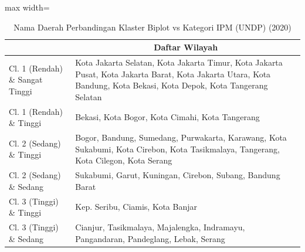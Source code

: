 \begin{table}[H]
\centering
\caption{Nama Daerah Perbandingan Klaster Biplot vs Kategori IPM (UNDP) (2020)} \label{tab:app2crossname2020}
\begin{adjustbox}{max width=\textwidth}
\begin{tabular}{|>{\centering\arraybackslash}p{4cm}|p{10cm}|}
\hline
\multicolumn{1}{|c|}{\textbf{Kategori}} & \multicolumn{1}{c|}{\textbf{Daftar Wilayah}} \\
\hline
Cl. 1 (Rendah) \& Sangat Tinggi & Kota Jakarta Selatan, Kota Jakarta Timur, Kota Jakarta Pusat, Kota Jakarta Barat, Kota Jakarta Utara, Kota Bandung, Kota Bekasi, Kota Depok, Kota Tangerang Selatan \\
\hline
Cl. 1 (Rendah) \& Tinggi & Bekasi, Kota Bogor, Kota Cimahi, Kota Tangerang \\
\hline
Cl. 2 (Sedang) \& Tinggi & Bogor, Bandung, Sumedang, Purwakarta, Karawang, Kota Sukabumi, Kota Cirebon, Kota Tasikmalaya, Tangerang, Kota Cilegon, Kota Serang \\
\hline
Cl. 2 (Sedang) \& Sedang & Sukabumi, Garut, Kuningan, Cirebon, Subang, Bandung Barat \\
\hline
Cl. 3 (Tinggi) \& Tinggi & Kep. Seribu, Ciamis, Kota Banjar \\
\hline
Cl. 3 (Tinggi) \& Sedang & Cianjur, Tasikmalaya, Majalengka, Indramayu, Pangandaran, Pandeglang, Lebak, Serang \\
\hline
\end{tabular}
\end{adjustbox}
\end{table}